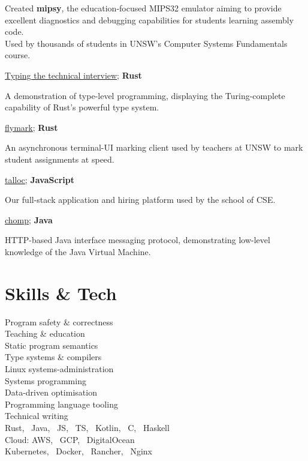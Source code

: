 \documentclass[a4paper]{deedy-resume}
\begin{document}
\begin{minipage}[t]{0.35\textwidth}
Created \textbf{mipsy}, the education-focused
MIPS32 emulator aiming to provide excellent
diagnostics and debugging capabilities for
students learning assembly code. \\
Used by thousands of students in
UNSW's Computer Systems Fundamentals course.

\vspace{6pt}

\href{https://github.com/insou22/typing-the-technical-interview-rust}
	{\underline{Typing the technical interview}}; \textbf{Rust}

A demonstration of type-level programming,
displaying the Turing-complete capability
of Rust's powerful type system.

\vspace{6pt}

\href{https://github.com/insou22/flymark}
	{\underline{flymark}}; \textbf{ Rust}

An asynchronous terminal-UI marking client
used by teachers at UNSW to mark student
assignments at speed.

\vspace{6pt}

\href{https://cgi.cse.unsw.edu.au/~talloc/}
	{\underline{talloc}}; \textbf{ JavaScript}

Our full-stack application and hiring platform
used by the school of CSE.

\vspace{6pt}

\href{https://github.com/insou22/chomp}
	{\underline{chomp}}; \textbf{ Java}

HTTP-based Java interface messaging protocol,
demonstrating low-level knowledge of the Java 
Virtual Machine.

\sectionspace
\section{Skills \& Tech}

Program safety \& correctness \\
Teaching \& education \\
Static program semantics \\
Type systems \& compilers \\
Linux systems-administration \\
Systems programming \\
Data-driven optimisation \\
Programming language tooling \\
Technical writing \\
Rust, \ Java, \ JS, \ TS, \ Kotlin, \ C, \ Haskell \\
Cloud: AWS, \ GCP, \ DigitalOcean \\
Kubernetes, \ Docker, \ Rancher, \ Nginx



\end{minipage}
\end{document}
